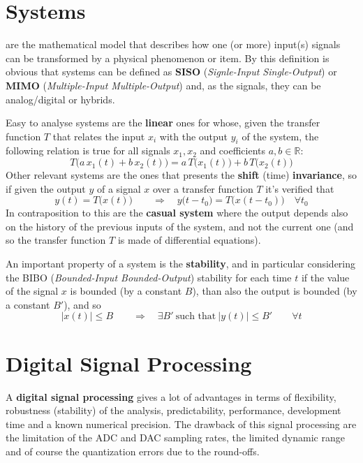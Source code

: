 \section*{Systems}
	 are the mathematical model that describes how one (or more) input(s) signals can be transformed by a physical phenomenon or item. By this definition is obvious that systems can be defined as \textbf{SISO} (\textit{Signle-Input Single-Output}) or \textbf{MIMO} (\textit{Multiple-Input Multiple-Output}) and, as the signals, they can be analog/digital or hybrids.
	
	Easy to analyse systems are the \textbf{linear} ones for whose, given the transfer function $T$ that relates the input $x_i$ with the output $y_i$ of the system, the following relation is true for all signals $x_1,x_2$ and coefficients $a,b\in \mathds R$:
	\[ T \Big( a \, x_1(t) + b\, x_2(t) \Big) = a \, T\Big(x_1(t)\Big) + b \, T\Big(x_2(t)\Big) \]
	Other relevant systems are the ones that presents the \textbf{shift} (time) \textbf{invariance}, so if given the output $y$ of a signal $x$ over a transfer function $T$ it's verified that
	\[ y(t) = T\Big(x(t)\Big) \qquad \Rightarrow \quad y\big(t-t_0\big) = T\Big(x(t-t_0)\Big) \quad \forall t_0 \]
	In contraposition to this are the \textbf{casual system} where the output depends also on the history of the previous inputs of the system, and not the current one (and so the transfer function $T$ is made of differential equations).
	
	An important property of a system is the \textbf{stability}, and in particular considering the BIBO (\textit{Bounded-Input Bounded-Output}) stability for each time $t$ if the value of the signal $x$ is bounded (by a constant $B$), than also the output is bounded (by a constant $B'$), and so
	\[ | x(t)| \leq B \qquad \Rightarrow \quad \exists B' \ \textrm{such that} \ |y(t)| \leq B' \qquad \forall t \]

\section*{Digital Signal Processing}
	A \textbf{digital signal processing} gives a lot of advantages in terms of flexibility, robustness (stability) of the analysis, predictability, performance, development time and a known numerical precision. The drawback of this signal processing are the limitation of the ADC and DAC sampling rates, the limited dynamic range and of course the quantization errors due to the round-offs.
	
